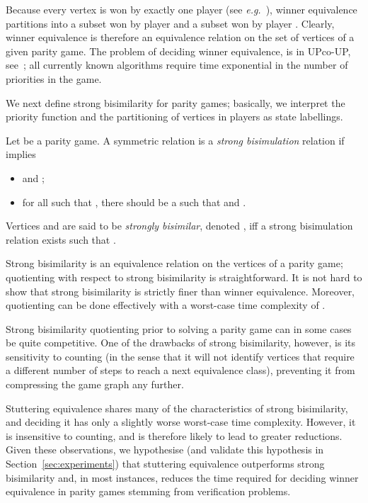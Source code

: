 \documentclass[a4paper]{llncs}
\newcommand{\eg}{\textit{e.g.}\xspace}
\begin{document}
Because every vertex is won by exactly one player (see \eg~\cite{Zie:98}),
winner equivalence partitions  into a subset won by player 
and a subset won by player . Clearly, winner equivalence is therefore 
an equivalence relation on the set of vertices of a given parity game.  
The problem of deciding winner equivalence, is in UPco-UP, 
see~\cite{Jur:98}; all currently known algorithms require time 
exponential in the number of priorities in the game.

We next define strong bisimilarity for parity games; basically, we
interpret the priority function and the partitioning of vertices in players
as state labellings.

\begin{definition}
Let  be a parity game. A
symmetric relation  is a \emph{strong bisimulation}
relation if  implies
\begin{itemize}
\item  and ;
\item for all  such that , there should be a 
 such that  and .
\end{itemize}
Vertices  and  are said to be \emph{strongly bisimilar},
denoted , iff a strong bisimulation relation  exists
such that .

\end{definition}
Strong bisimilarity is an equivalence relation on the vertices
of a parity game; quotienting with respect to strong bisimilarity is
straightforward. It is not hard to show that strong bisimilarity is
strictly finer than winner equivalence.  Moreover, quotienting can be
done effectively with a worst-case time complexity of .  

Strong bisimilarity quotienting prior to solving a parity game can in some
cases be quite competitive. One of the drawbacks of strong bisimilarity,
however, is its sensitivity to counting (in the sense that it will not
identify vertices that require a different number of steps to reach a
next equivalence class), preventing it from compressing the game graph
any further.

Stuttering equivalence shares many of the characteristics
of strong bisimilarity, and deciding it has only a slightly worse
worst-case time complexity. However, it is insensitive to counting,
and is therefore likely to lead to greater reductions. Given these
observations, we hypothesise (and validate this hypothesis in
Section~\ref{sec:experiments}) that stuttering equivalence
outperforms strong bisimilarity and, in most instances, reduces the time
required for deciding winner equivalence in parity games stemming from
verification problems.
\end{document}
